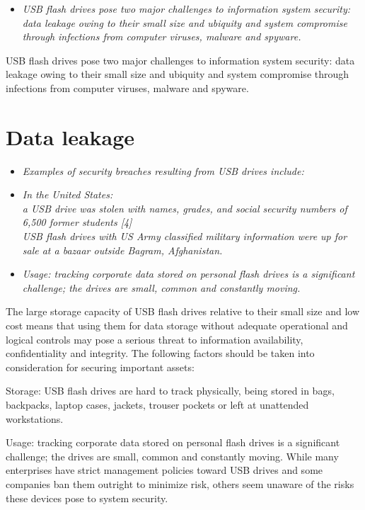 \begin{itemize}
\item
  \emph{USB flash drives pose two major challenges to information system
  security: data leakage owing to their small size and ubiquity and
  system compromise through infections from computer viruses, malware
  and spyware.}
\end{itemize}

USB flash drives pose two major challenges to information system
security: data leakage owing to their small size and ubiquity and system
compromise through infections from computer viruses, malware and
spyware.

\section{Data leakage}\label{data-leakage}

\begin{itemize}
\item
  \emph{Examples of security breaches resulting from USB drives
  include:}
\item
  \emph{In the United States:\\
  a USB drive was stolen with names, grades, and social security numbers
  of 6,500 former students {[}4{]}\\
  USB flash drives with US Army classified military information were up
  for sale at a bazaar outside Bagram, Afghanistan.}
\item
  \emph{Usage: tracking corporate data stored on personal flash drives
  is a significant challenge; the drives are small, common and
  constantly moving.}
\end{itemize}

The large storage capacity of USB flash drives relative to their small
size and low cost means that using them for data storage without
adequate operational and logical controls may pose a serious threat to
information availability, confidentiality and integrity. The following
factors should be taken into consideration for securing important
assets:

Storage: USB flash drives are hard to track physically, being stored in
bags, backpacks, laptop cases, jackets, trouser pockets or left at
unattended workstations.

Usage: tracking corporate data stored on personal flash drives is a
significant challenge; the drives are small, common and constantly
moving. While many enterprises have strict management policies toward
USB drives and some companies ban them outright to minimize risk, others
seem unaware of the risks these devices pose to system security.

